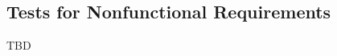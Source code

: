 \documentclass[12pt, titlepage]{article}
\begin{document}
					
					
					



    



\subsection{Tests for Nonfunctional Requirements}
TBD


		


					
					
					
					
					
\end{document}
